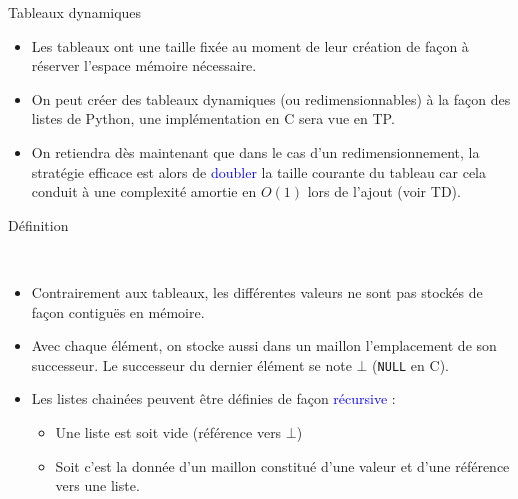 \documentclass[10pt]{beamer}
\begin{document}
\begin{frame}{\Ctitle}{\stitle}
	\begin{block}{Tableaux dynamiques}
		\begin{itemize}
			\item<1-> Les tableaux ont une taille fixée au moment de leur création de façon à réserver l'espace mémoire nécessaire.
			\item<2-> On peut créer des tableaux dynamiques (ou redimensionnables) à la façon des listes de Python, une implémentation en C sera vue en TP.
			\item<3-> On retiendra dès maintenant que dans le cas d'un redimensionnement, la stratégie efficace est alors de \textcolor{blue}{doubler} la taille courante du tableau car cela conduit à une complexité amortie en $O(1)$ lors de l'ajout (voir TD).
		\end{itemize}
	\end{block}
\end{frame}


\begin{frame}{\Ctitle}{\stitle}
	\begin{alertblock}{Définition}
		\begin{center}
			  \quad {} \          \  
		\end{center}
		\begin{itemize}
			\item<2-> Contrairement aux tableaux, les différentes valeurs ne sont pas stockés de façon contiguës en mémoire.
			\item<3-> Avec chaque élément, on stocke aussi dans un \og{} maillon \fg{} l'emplacement de son successeur. Le successeur du dernier élément se note $\bot$ (\texttt{NULL} en C).
			\item<6-> Les listes chainées peuvent être définies de façon \textcolor{blue}{récursive} :
				\begin{itemize}
					\item<7-> Une liste est soit vide (référence vers $\bot$)
					\item<8-> Soit c'est la donnée d'un maillon constitué d'une valeur et d'une référence vers une liste.
				\end{itemize}
		\end{itemize}
	\end{alertblock}
\end{frame}
\end{document}
